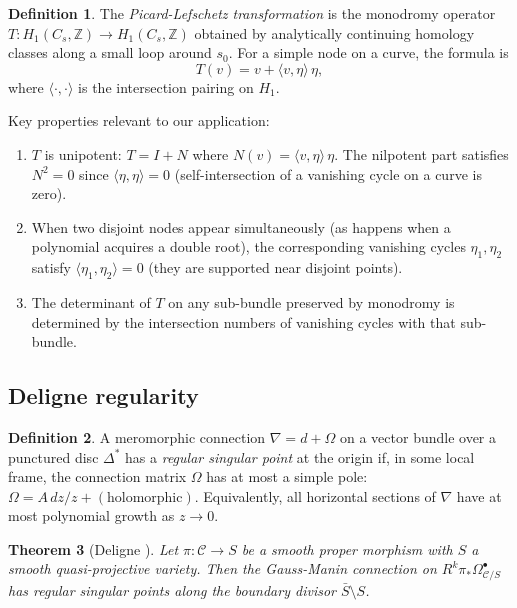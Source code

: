 \documentclass[11pt]{article}
\theoremstyle{plain}
\newtheorem{theorem}{Theorem}[section]
\theoremstyle{definition}
\newtheorem{definition}[theorem]{Definition}
\theoremstyle{remark}
\newcommand{\ZZ}{\mathbb{Z}}
\begin{document}
\begin{definition}\label{def:picard-lefschetz}
The \emph{Picard-Lefschetz transformation} is the monodromy operator
$T: H_1(C_s, \ZZ) \to H_1(C_s, \ZZ)$ obtained by analytically continuing
homology classes along a small loop around $s_0$.  For a simple node
on a curve, the formula is
\[
  T(v) = v + \langle v, \eta \rangle \, \eta,
\]
where $\langle \cdot, \cdot \rangle$ is the intersection pairing on $H_1$.
\end{definition}

Key properties relevant to our application:
\begin{enumerate}[label=(\roman*)]
\item $T$ is unipotent: $T = I + N$ where $N(v) = \langle v, \eta\rangle\,\eta$.
  The nilpotent part satisfies $N^2 = 0$ since $\langle \eta, \eta\rangle = 0$
  (self-intersection of a vanishing cycle on a curve is zero).
\item When two disjoint nodes appear simultaneously (as happens when a
  polynomial acquires a double root), the corresponding vanishing cycles
  $\eta_1, \eta_2$ satisfy $\langle \eta_1, \eta_2 \rangle = 0$ (they
  are supported near disjoint points).
\item The determinant of $T$ on any sub-bundle preserved by monodromy is
  determined by the intersection numbers of vanishing cycles with that
  sub-bundle.
\end{enumerate}

\subsection{Deligne regularity}\label{subsec:deligne}

\begin{definition}\label{def:regular-singular}
A meromorphic connection $\nabla = d + \Omega$ on a vector bundle over a
punctured disc $\Delta^*$ has a \emph{regular singular point} at the origin if,
in some local frame, the connection matrix $\Omega$ has at most a simple pole:
$\Omega = A\,dz/z + (\text{holomorphic})$.  Equivalently, all horizontal sections
of $\nabla$ have at most polynomial growth as $z \to 0$.
\end{definition}

\begin{theorem}[Deligne \cite{deligne}]\label{thm:deligne-regularity}
Let $\pi: \mathcal{C} \to S$ be a smooth proper morphism with $S$ a smooth
quasi-projective variety.  Then the Gauss-Manin connection on
$R^k\pi_*\Omega^\bullet_{\mathcal{C}/S}$ has regular singular points along
the boundary divisor $\bar{S} \setminus S$.
\end{theorem}
\end{document}
